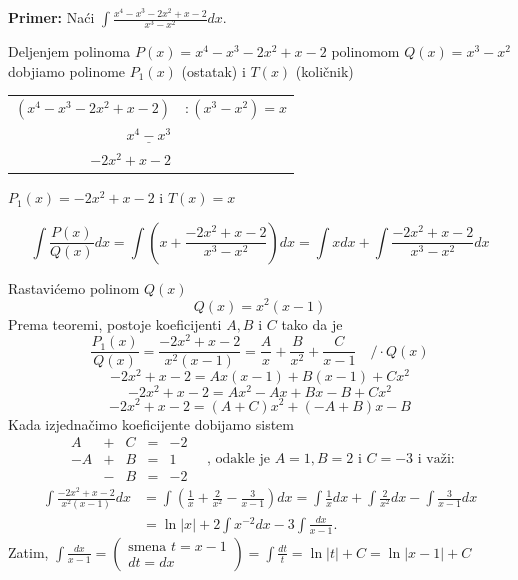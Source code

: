 \documentclass[a4paper,12pt,twoside]{report}
\numberwithin{algorithm}{section}
\begin{document}
\vspace{0.5cm}

\noindent \textbf{Primer:} Naći \(\displaystyle \int \frac{x^4 - x^3 - 2x^2 + x - 2}{x^3 - x^2} dx\).

Deljenjem polinoma \(P(x) = x^4 - x^3 - 2x^2 + x - 2\) polinomom \(Q(x) = x^3 - x^2\)
dobjiamo polinome \(P_1(x)\) (ostatak) i \(T(x)\) (količnik)
\begin{center}
\begin{tabular}{r@{\quad}l}
    \((x^4 - x^3 - 2x^2 + x - 2)\) & \(: (x^3 - x^2) = x\) \\
    \(\underline{x^4 - x^3}\) & \\
    \(-2x^2 + x - 2\) &
\end{tabular}
\end{center}
\(P_1(x) = -2x^2 + x - 2\) i \(T(x) = x\)

\[
    \int \frac{P(x)}{Q(x)} dx = \int \left( x + \frac{-2x^2 + x - 2}{x^3 - x^2} \right) dx = \int x dx + \int \frac{-2x^2 + x - 2}{x^3 - x^2} dx
\]

Rastavićemo polinom \(Q(x)\)
\[
    Q(x) = x^2(x-1)
\]
Prema teoremi, postoje koeficijenti \(A, B\) i \(C\) tako da je
\[
    \frac{P_1(x)}{Q(x)} = \frac{-2x^2 + x - 2}{x^2(x-1)} = \frac{A}{x} + \frac{B}{x^2} + \frac{C}{x-1} \quad \Big/ \cdot Q(x)
\]
\[
    -2x^2 + x - 2 = Ax(x-1) + B(x-1) + Cx^2
\]
\[
    -2x^2 + x - 2 = Ax^2 - Ax + Bx - B + Cx^2
\]
\[
    -2x^2 + x - 2 = (A+C)x^2 + (-A+B)x - B
\]
Kada izjednačimo koeficijente dobijamo sistem
\[
    \begin{array}{rcrcr}
        A & + & C & = & -2 \\
        -A & + & B & = & 1 \\
        & - & B & = & -2
    \end{array}
    \quad \text{, odakle je } A=1, B=2 \text{ i } C=-3 \text{ i važi:}
\]
\begin{align*}
    \int \frac{-2x^2 + x - 2}{x^2(x-1)} dx &= \int \left( \frac{1}{x} + \frac{2}{x^2} - \frac{3}{x-1} \right) dx = \int \frac{1}{x} dx + \int \frac{2}{x^2} dx - \int \frac{3}{x-1} dx \\
    &= \ln|x| + 2 \int x^{-2} dx - 3 \int \frac{dx}{x-1}.
\end{align*}
Zatim, \(\displaystyle \int \frac{dx}{x-1} = \left( \begin{array}{l} \text{smena } t=x-1 \\ dt=dx \end{array} \right) = \int \frac{dt}{t} = \ln|t| + C = \ln|x-1| + C\)
\end{document}
